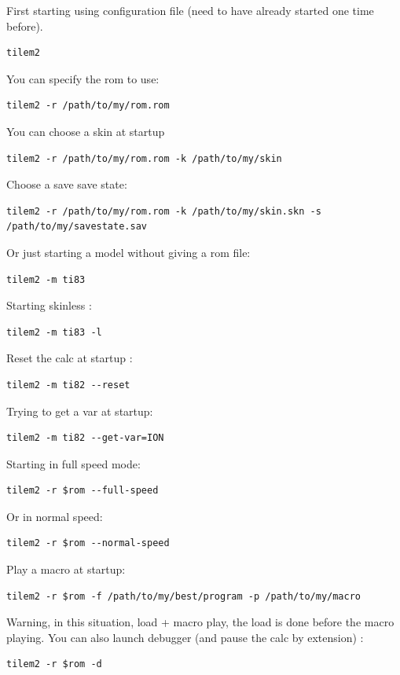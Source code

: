 \documentclass[10pt]{report}
\begin{document}
First starting using configuration file (need to have already started one time before). 
\begin{lstlisting}
tilem2
\end{lstlisting}
You can specify the rom to use:\newline
\begin{lstlisting}
tilem2 -r /path/to/my/rom.rom
\end{lstlisting}
You can choose a skin at startup
\begin{lstlisting}
tilem2 -r /path/to/my/rom.rom -k /path/to/my/skin
\end{lstlisting}
Choose a save save state: \newline
\begin{lstlisting}
tilem2 -r /path/to/my/rom.rom -k /path/to/my/skin.skn -s /path/to/my/savestate.sav
\end{lstlisting}
Or just starting a model without giving a rom file:\newline
\begin{lstlisting}
tilem2 -m ti83
\end{lstlisting}
Starting skinless :\newline
\begin{lstlisting}
tilem2 -m ti83 -l
\end{lstlisting}
Reset the calc at startup :\newline
\begin{lstlisting}
tilem2 -m ti82 --reset
\end{lstlisting}
Trying to get a var at startup:\newline
\begin{lstlisting}
tilem2 -m ti82 --get-var=ION
\end{lstlisting}
Starting in full speed mode:\newline
\begin{lstlisting}
tilem2 -r $rom --full-speed
\end{lstlisting}
Or in normal speed:
\begin{lstlisting}
tilem2 -r $rom --normal-speed
\end{lstlisting}
Play a macro at startup:\newline
\begin{lstlisting}
tilem2 -r $rom -f /path/to/my/best/program -p /path/to/my/macro
\end{lstlisting}
Warning, in this situation, load + macro play, the load is done before the macro playing.\newline\newline
You can also launch debugger (and pause the calc by extension) :\newline
\begin{lstlisting}
tilem2 -r $rom -d
\end{lstlisting}
\end{document}
